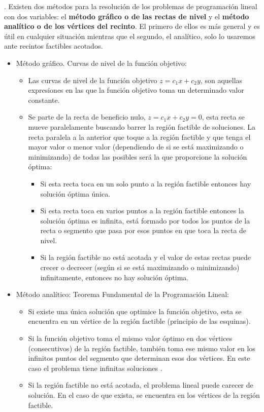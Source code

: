 \begin{theorem}	
.	Existen dos métodos para la resolución de los problemas de programación lineal con dos variables: el \textbf{método gráfico o de las rectas de nivel} y el \textbf{método analítico o de los vértices del recinto}. El primero de ellos es más general y es útil en cualquier situación mientras que el segundo, el analítico, solo lo usaremos ante recintos factibles acotados.

\begin{itemize}
\item Método gráfico. Curvas de nivel de la función objetivo:
	\begin{itemize}
	\item Las curvas de nivel de la función objetivo $z= c_1x+c_2y$, son aquellas expresiones en las que la función objetivo toma un determinado valor constante.
	\item Se parte de la recta de beneficio nulo, $z=c_1x+c_2y=0$, esta recta se mueve paralelamente buscando barrer la región factible de soluciones. La recta paralela a la anterior que toque a la región factible y que tenga el mayor valor o menor valor (dependiendo de si se está maximizando o minimizando) de todas las posibles será la que proporcione la solución óptima:
		\begin{itemize}
		\item Si esta recta toca en un solo punto a la región factible entonces hay solución óptima única.
		\item Si esta recta toca en varios puntos a la región factible entonces la solución óptima es infinita, está formado por todos los puntos de la recta o segmento que pasa por esos puntos en que toca la recta de nivel.
		\item Si la región factible no está acotada y el valor de estas rectas puede crecer o decrecer (según si se está maximizando o minimizando) infinitamente, entonces no hay solución óptima.
		\end{itemize}
	\end{itemize}
\item Método analítico: Teorema Fundamental de la Programación Lineal:
	\begin{itemize}
	\item Si existe una única solución que optimice la función objetivo, esta se encuentra en un vértice de la región factible (principio de las esquinas).
	\item Si la función objetivo toma el mismo valor óptimo en dos vértices (consecutivos) de la región factible, también toma ese mismo valor en los infinitos puntos del segmento que determinan esos dos vértices. En este caso el problema tiene infinitas soluciones .
	\item Si la región factible no está acotada, el problema lineal puede carecer de solución. En el caso de que exista, se encuentra en los vértices de la región factible.
	\end{itemize}
\end{itemize}
\end{theorem}	

